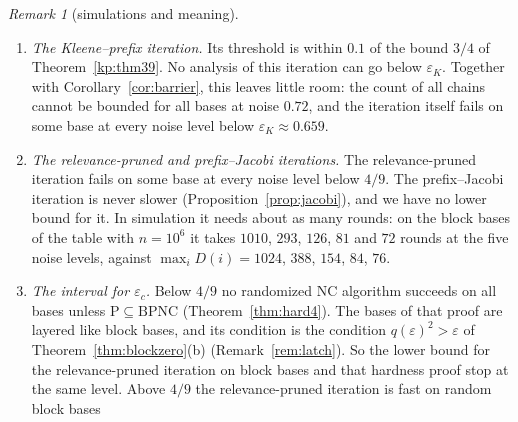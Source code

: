 \documentclass[11pt]{amsart}
\theoremstyle{definition}
\theoremstyle{remark}
\newtheorem{remark}[theorem]{Remark}
\newcommand{\eps}{\varepsilon}
\begin{document}
\begin{remark}[simulations and meaning]
\begin{enumerate}[label=(\roman*),leftmargin=2.4em]
\noindent Below $d^*\approx0.382$ both depths are close to the number of blocks; between $d^*$ and
$1-d^*$ only $d$ is. Above $1-d^*$ the depth $d$ grows more slowly than the number of blocks. With
blocks of $100$ positions, where the three sizes give $999$, $9999$ and $99999$ blocks,
$\max_id(i)$ is $286$, $675$, $1081$ at noise $0.66$ and $178$, $433$, $645$ at noise $0.70$: a
roughly constant amount per factor $10$, with a large constant because $\theta$ is close to $1$.
With the blocks in
the last tenth of $n=10^7$ positions, on top of zero gates ($m=2000$, $500$ blocks), $\max_id(i)$
is $534$, $525$, $383$, $197$, $123$ at noise $0.60$, $0.63$, $0.65$, $0.67$, $0.70$, and
$\max_iD(i)$ is $508$, $505$, $402$, $212$, $101$ at noise $0.38$, $0.42$, $0.44$, $0.46$, $0.50$,
consistent with $\eps_K\approx0.659$ and $4/9$. These runs do not locate the levels to two
digits: with the blocks in the last tenth, the prefix density is about $0.01$ above $\varpi$, and
the entries just below the levels are already under the number of blocks. All entries of this
remark use seed $1$.
\item \emph{The Kleene--prefix iteration.} Its threshold is within $0.1$ of the bound $3/4$ of
Theorem~\ref{kp:thm39}. No analysis of this iteration can go below $\eps_K$. Together with
Corollary~\ref{cor:barrier}, this leaves little room: the count of all chains cannot be bounded
for all bases at noise $0.72$, and the iteration itself fails on some base at every noise level
below $\eps_K\approx0.659$.
\item \emph{The relevance-pruned and prefix--Jacobi iterations.} The relevance-pruned iteration
fails on some base at every noise level below $4/9$. The prefix--Jacobi iteration is never slower
(Proposition~\ref{prop:jacobi}), and we have no lower bound for it. In simulation it needs about
as many rounds: on the block bases of the table with $n=10^6$ it takes $1010$, $293$, $126$, $81$
and $72$ rounds at the five noise levels, against $\max_iD(i)=1024$, $388$, $154$, $84$, $76$.
\item \emph{The interval for $\eps_c$.} Below $4/9$ no randomized NC algorithm succeeds on all
bases unless $\mathrm P\subseteq\mathrm{BPNC}$ (Theorem~\ref{thm:hard4}). The bases of that proof
are layered like block bases, and its condition is the condition $q(\eps)^2>\eps$ of
Theorem~\ref{thm:blockzero}(b) (Remark~\ref{rem:latch}). So the lower bound for the
relevance-pruned iteration on block bases and that hardness proof stop at the same level. Above
$4/9$ the relevance-pruned iteration is fast on random block bases

\end{enumerate}
\end{remark}
\end{document}
